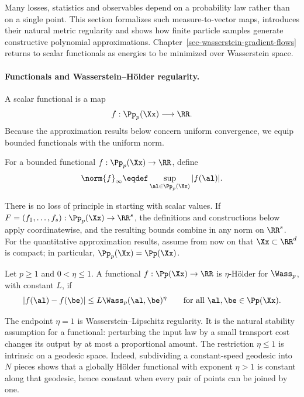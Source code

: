 Many losses, statistics and observables depend on a probability law rather than on a single point. This section formalizes such measure-to-vector maps, introduces their natural metric regularity and shows how finite particle samples generate constructive polynomial approximations. Chapter~\ref{sec-wasserstein-gradient-flows} returns to scalar functionals as energies to be minimized over Wasserstein space.

\paragraph{Functionals and Wasserstein--H\"older regularity.}

A scalar functional is a map
\[
	f:\Pp_p(\Xx)\longrightarrow\RR.
\]
Because the approximation results below concern uniform convergence, we equip bounded functionals with the uniform norm.

\begin{defn}\label{def-uniform-norm-functionals}
	For a bounded functional \(f:\Pp_p(\Xx)\to\RR\), define
	\[
		\norm{f}_\infty
		\eqdef
		\sup_{\al\in\Pp_p(\Xx)}|f(\al)|.
	\]
\end{defn}

There is no loss of principle in starting with scalar values. If \(F=(f_1,\ldots,f_s):\Pp_p(\Xx)\to\RR^s\), the definitions and constructions below apply coordinatewise, and the resulting bounds combine in any norm on \(\RR^s\). For the quantitative approximation results, assume from now on that \(\Xx\subset\RR^d\) is compact; in particular, \(\Pp_p(\Xx)=\Pp(\Xx)\).

\begin{defn}\label{def-wasserstein-holder-functional}
	Let \(p\geq1\) and \(0<\eta\leq1\). A functional \(f:\Pp(\Xx)\to\RR\) is \(\eta\)-H\"older for \(\Wass_p\), with constant \(L\), if
	\begin{equation}\label{eq-wasserstein-holder-functional}
		|f(\al)-f(\be)|
		\leq
		L\Wass_p(\al,\be)^\eta
		\qquad
		\text{for all }\al,\be\in\Pp(\Xx).
	\end{equation}
\end{defn}

The endpoint \(\eta=1\) is Wasserstein--Lipschitz regularity. It is the natural stability assumption for a functional: perturbing the input law by a small transport cost changes its output by at most a proportional amount. The restriction \(\eta\leq1\) is intrinsic on a geodesic space. Indeed, subdividing a constant-speed geodesic into \(N\) pieces shows that a globally H\"older functional with exponent \(\eta>1\) is constant along that geodesic, hence constant when every pair of points can be joined by one.

